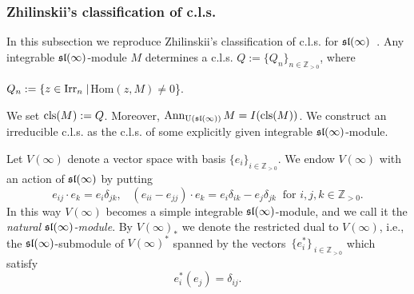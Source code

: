 \documentclass[10pt]{amsart}\oddsidemargin -1mm \evensidemargin -1mm \topmargin -15mm\headheight5mm \headsep 3.5mm \textheight 245mm\textwidth 170mm %
\theoremstyle{definition}\newtheorem{theorem}{Theorem}[section]\newtheorem{lemma}[theorem]{Lemma}\newtheorem{remark}[theorem]{Remark}\newtheorem{proposition}[theorem]{Proposition}\newtheorem{corollary}[theorem]{Corollary}\newtheorem{definition}[theorem]{Definition}\newtheorem{Ex}[theorem]{Example}
\begin{document}
\subsubsection{Zhilinskii's classification of c.l.s.}In this
subsection we reproduce Zhilinskii's classification of
c.l.s. for $\frak{sl}(\infty)$~\cite{Zh1}.
Any integrable $\frak{sl}(\infty)$-module $M$ determines a c.l.s.
$Q:=\{Q_n\}_{n\in\mathbb Z_{>0}}$, where
\begin{center}$Q_n:=\{z\in\operatorname{\mathrm{Irr}}_n\mid$Hom$(z, M)\ne 0$\}.\end{center}
We set $\operatorname{\mathrm{cls}}(M):=Q$. Moreover, $\operatorname{\mathrm{Ann}}_{\operatorname{\mathrm{U}}(\frak{sl}(\infty))} M=I(\operatorname{\mathrm{cls}}(M))$. We construct an irreducible c.l.s. as the c.l.s. of some explicitly given integrable $\frak{sl}(\infty)$-module.

Let $V(\infty)$ denote a vector space with basis $\{e_i\}_{i\in\mathbb Z_{>0}}$. We endow $V(\infty)$ with an action of $\frak{sl}(\infty)$ by putting$$e_{ij}\cdot e_k=e_i\delta_{jk},\hspace{10pt}(e_{ii}-e_{jj})\cdot e_k=e_i\delta_{ik}-e_j\delta_{jk}~\mbox{~for~}i, j, k\in\mathbb Z_{>0}.$$In this way $V(\infty)$ becomes a simple integrable $\frak{sl}(\infty)$-module, and we call it the {\it natural $\frak{sl}(\infty)$-module}. By $V(\infty)_*$ we denote the restricted dual to $V(\infty)$, i.e., the $\frak{sl}(\infty)$-submodule of $V(\infty)^*$ spanned by
the vectors~$\{e_i^*\}_{~i\in\mathbb Z_{>0}}$ which satisfy
$$e_i^*(e_j)=\delta_{ij}.$$
\end{document}
